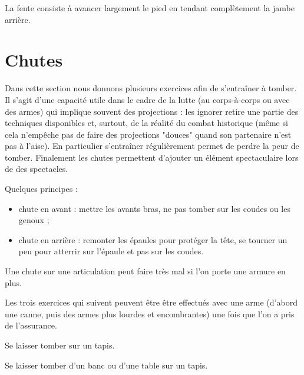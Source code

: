 \begin{definition}[Fente]

	La fente consiste à avancer largement le pied en tendant complètement la jambe arrière.
\end{definition}




\section{Chutes}


Dans cette section nous donnons plusieurs exercices afin de s'entraîner à tomber.
Il s'agit d'une capacité utile dans le cadre de la lutte (au corps-à-corps ou avec des armes) qui implique souvent des projections : les ignorer retire une partie des techniques disponibles et, surtout, de la réalité du combat historique (même si cela n'empêche pas de faire des projections "douces" quand son partenaire n'est pas à l'aise).
En particulier s'entraîner régulièrement permet de perdre la peur de tomber.
Finalement les chutes permettent d'ajouter un élément spectaculaire lors de des spectacles.


\noindent
Quelques principes :
\begin{itemize}
	\item chute en avant : mettre les avants bras, ne pas tomber sur les coudes ou les genoux ;
	\item chute en arrière : remonter les épaules pour protéger la tête, se tourner un peu pour atterrir sur l'épaule et pas sur les coudes.
\end{itemize}
Une chute sur une articulation peut faire très mal si l'on porte une armure en plus.


Les trois exercices qui suivent peuvent être être effectués avec une arme (d'abord une canne, puis des armes plus lourdes et encombrantes) une fois que l'on a pris de l'assurance.


\begin{exercice}[Chute]


	Se laisser tomber sur un tapis.

\end{exercice}


\begin{exercice}


	Se laisser tomber d'un banc ou d'une table sur un tapis.

\end{exercice}


